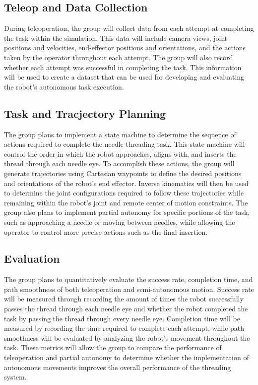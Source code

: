 \documentclass[conference]{IEEEtran}
\begin{document}
\subsection{Teleop and Data Collection}
    During teleoperation, the group will collect data from each attempt at completing the task within the simulation. This data will include camera views, joint positions and velocities, end-effector positions and orientations, and the actions taken by the operator throughout each attempt. The group will also record whether each attempt was successful in completing the task. This information will be used to create a dataset that can be used for developing and evaluating the robot's autonomous task execution.
\subsection{Task and Tracjectory Planning}
    The group plans to implement a state machine to determine the sequence of actions required to complete the needle-threading task. This state machine will control the order in which the robot approaches, aligns with, and inserts the thread through each needle eye. To accomplish these actions, the group will generate trajectories using Cartesian waypoints to define the desired positions and orientations of the robot's end effector. Inverse kinematics will then be used to determine the joint configurations required to follow these trajectories while remaining within the robot's joint and remote center of motion constraints. The group also plans to implement partial autonomy for specific portions of the task, such as approaching a needle or moving between needles, while allowing the operator to control more precise actions such as the final insertion.
\subsection{Evaluation}
    The group plans to quantitatively evaluate the success rate, completion time, and path smoothness of both teleoperation and semi-autonomous motion. Success rate will be measured through recording the amount of times the robot successfully passes the thread through each needle eye and whether the robot completed the task by passing the thread through every needle eye. Completion time will be measured by recording the time required to complete each attempt, while path smoothness will be evaluated by analyzing the robot's movement throughout the task. These metrics will allow the group to compare the performance of teleoperation and partial autonomy to determine whether the implementation of autonomous movements improves the overall performance of the threading system.
\end{document}
